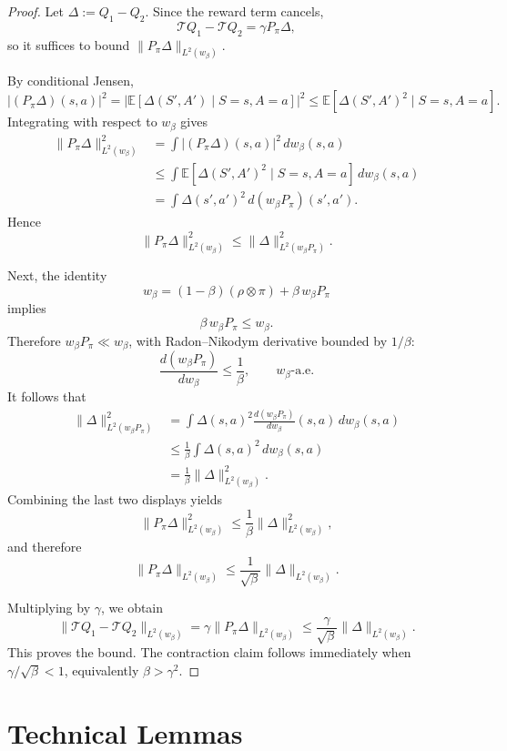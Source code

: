 \documentclass{article}
\newcommand{\E}{\mathbb{E}}
\theoremstyle{plain}
\theoremstyle{definition}
\theoremstyle{remark}
\begin{document}
\begin{proof}
Let \(\Delta:=Q_1-Q_2\). Since the reward term cancels,
\[
\mathcal T Q_1-\mathcal T Q_2=\gamma P_\pi\Delta,
\]
so it suffices to bound \(\|P_\pi\Delta\|_{L^2(w_\beta)}\).

By conditional Jensen,
\[
|(P_\pi\Delta)(s,a)|^2
=
\left|
\E\!\left[\Delta(S',A')\mid S=s,A=a\right]
\right|^2
\le
\E\!\left[\Delta(S',A')^2\mid S=s,A=a\right].
\]
Integrating with respect to \(w_\beta\) gives
\begin{align*}
\|P_\pi\Delta\|_{L^2(w_\beta)}^2
&=
\int |(P_\pi\Delta)(s,a)|^2\,dw_\beta(s,a) \\
&\le
\int \E\!\left[\Delta(S',A')^2\mid S=s,A=a\right]\,dw_\beta(s,a) \\
&=
\int \Delta(s',a')^2\,d(w_\beta P_\pi)(s',a').
\end{align*}
Hence
\[
\|P_\pi\Delta\|_{L^2(w_\beta)}^2
\le
\|\Delta\|_{L^2(w_\beta P_\pi)}^2.
\]

Next, the identity
\[
w_\beta=(1-\beta)(\rho\otimes\pi)+\beta\,w_\beta P_\pi
\]
implies
\[
\beta\,w_\beta P_\pi\le w_\beta.
\]
Therefore \(w_\beta P_\pi\ll w_\beta\), with Radon--Nikodym derivative bounded
by \(1/\beta\):
\[
\frac{d(w_\beta P_\pi)}{dw_\beta}\le \frac{1}{\beta},
\qquad
w_\beta\text{-a.e.}
\]
It follows that
\begin{align*}
\|\Delta\|_{L^2(w_\beta P_\pi)}^2
&=
\int \Delta(s,a)^2
\frac{d(w_\beta P_\pi)}{dw_\beta}(s,a)\,dw_\beta(s,a) \\
&\le
\frac{1}{\beta}\int \Delta(s,a)^2\,dw_\beta(s,a) \\
&=
\frac{1}{\beta}\|\Delta\|_{L^2(w_\beta)}^2.
\end{align*}
Combining the last two displays yields
\[
\|P_\pi\Delta\|_{L^2(w_\beta)}^2
\le
\frac{1}{\beta}\|\Delta\|_{L^2(w_\beta)}^2,
\]
and therefore
\[
\|P_\pi\Delta\|_{L^2(w_\beta)}
\le
\frac{1}{\sqrt{\beta}}\|\Delta\|_{L^2(w_\beta)}.
\]

Multiplying by \(\gamma\), we obtain
\[
\|\mathcal T Q_1-\mathcal T Q_2\|_{L^2(w_\beta)}
=
\gamma\|P_\pi\Delta\|_{L^2(w_\beta)}
\le
\frac{\gamma}{\sqrt{\beta}}\|\Delta\|_{L^2(w_\beta)}.
\]
This proves the bound. The contraction claim follows immediately when
\(\gamma/\sqrt{\beta}<1\), equivalently \(\beta>\gamma^2\).
\end{proof}


 
 


\section{Technical Lemmas}
\end{document}
